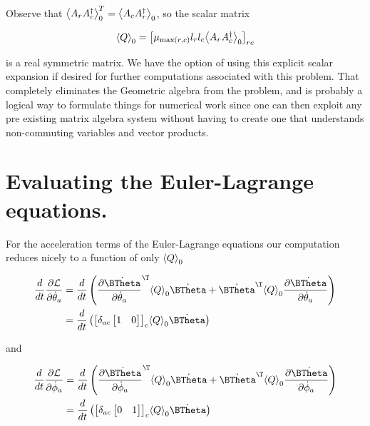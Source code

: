 Observe that ${\left\langle{{A_r A_c^\dagger}}\right\rangle}_{0}^T = {\left\langle{{A_c A_r^\dagger}}\right\rangle}_{0}$, so the scalar matrix

\begin{align}\label{eqn:multiPendulumSpherical2:boo21}
{\left\langle{{Q}}\right\rangle}_{0} = 
{\begin{bmatrix}
\mu_{\max(r,c)} l_r l_c {\left\langle{{ A_r A_c^\dagger }}\right\rangle}_{0}
\end{bmatrix}}_{rc}
\end{align}

is a real symmetric matrix.  We have the option of using this explicit scalar expansion if desired for further computations associated with this problem.  That completely eliminates the Geometric algebra from the problem, and is probably a logical way to formulate things for numerical work since one can then exploit any pre existing matrix algebra system without having to create one that understands non-commuting variables and vector products.

\section{Evaluating the Euler-Lagrange equations.}

For the acceleration terms of the Euler-Lagrange equations our computation reduces nicely to a function of only ${\left\langle{{Q}}\right\rangle}_{0}$

\begin{align*}
\frac{d}{dt} \PD{\dot{\theta}_a}{\LL}
&=
\frac{d}{dt} 
\left(
\PD{\dot{\theta}_a}{\dot{\BTheta}}^\T
\gpgradezero{Q} 
\dot{\BTheta}
+
\dot{\BTheta}^\T
\gpgradezero{Q} 
\PD{\dot{\theta}_a}{\dot{\BTheta}}
\right)  \\
&=
\frac{d}{dt} \left(
{\begin{bmatrix}
\delta_{ac}
\begin{bmatrix}
1 & 0
\end{bmatrix}
\end{bmatrix}}_c
\gpgradezero{Q} 
\dot{\BTheta}
\right) 
\end{align*}

and

\begin{align*}
\frac{d}{dt} \PD{\dot{\phi}_a}{\LL}
&=
\frac{d}{dt} 
\left(
\PD{\dot{\phi}_a}{\dot{\BTheta}}^\T
\gpgradezero{Q} 
\dot{\BTheta}
+
\dot{\BTheta}^\T
\gpgradezero{Q} 
\PD{\dot{\phi}_a}{\dot{\BTheta}}
\right)  \\
&=
\frac{d}{dt} \left(
{\begin{bmatrix}
\delta_{ac}
\begin{bmatrix}
0 & 1
\end{bmatrix}
\end{bmatrix}}_c
\gpgradezero{Q} 
\dot{\BTheta}
\right) 
\end{align*}

